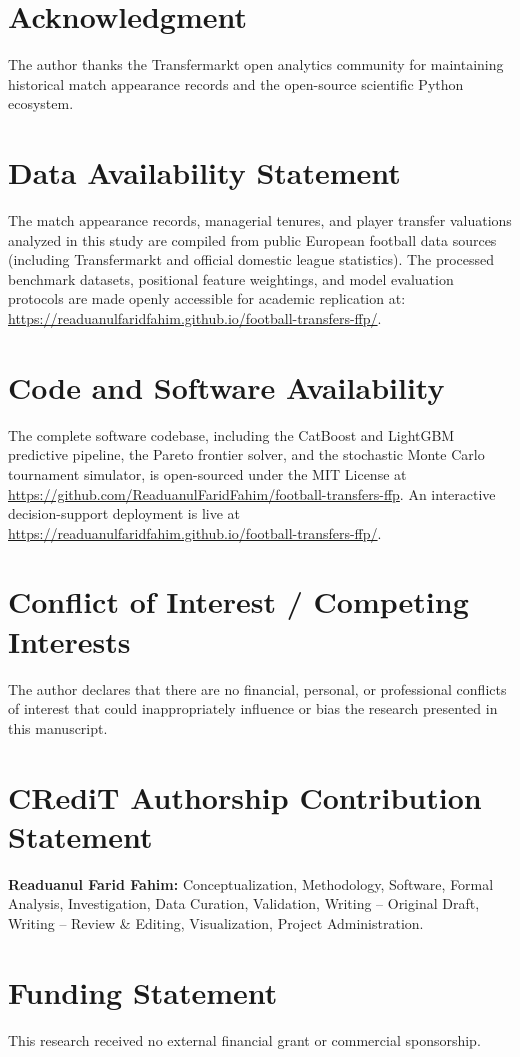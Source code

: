 \documentclass[10pt,journal,compsoc]{IEEEtran}
\begin{document}
\section*{Acknowledgment}
The author thanks the Transfermarkt open analytics community for maintaining historical match appearance records and the open-source scientific Python ecosystem.

\section*{Data Availability Statement}
The match appearance records, managerial tenures, and player transfer valuations analyzed in this study are compiled from public European football data sources (including Transfermarkt and official domestic league statistics). The processed benchmark datasets, positional feature weightings, and model evaluation protocols are made openly accessible for academic replication at: \url{https://readuanulfaridfahim.github.io/football-transfers-ffp/}.

\section*{Code and Software Availability}
The complete software codebase, including the CatBoost and LightGBM predictive pipeline, the Pareto frontier solver, and the stochastic Monte Carlo tournament simulator, is open-sourced under the MIT License at \url{https://github.com/ReaduanulFaridFahim/football-transfers-ffp}. An interactive decision-support deployment is live at \url{https://readuanulfaridfahim.github.io/football-transfers-ffp/}.

\section*{Conflict of Interest / Competing Interests}
The author declares that there are no financial, personal, or professional conflicts of interest that could inappropriately influence or bias the research presented in this manuscript.

\section*{CRediT Authorship Contribution Statement}
\textbf{Readuanul Farid Fahim:} Conceptualization, Methodology, Software, Formal Analysis, Investigation, Data Curation, Validation, Writing -- Original Draft, Writing -- Review \& Editing, Visualization, Project Administration.

\section*{Funding Statement}
This research received no external financial grant or commercial sponsorship.



\end{document}
